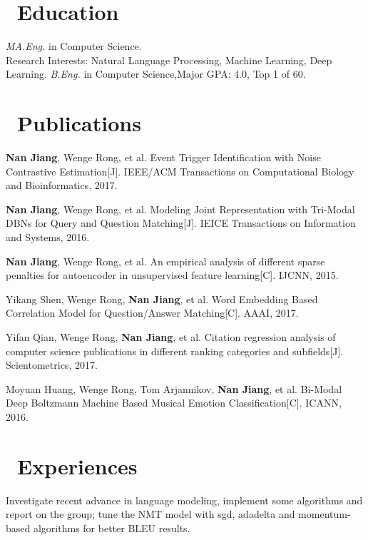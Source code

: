 \documentclass{resume}
\begin{document}



\section{\faGraduationCap\ Education }
\emph{MA.Eng.} in Computer Science. \\
Research Interests: Natural Language Processing, Machine Learning, Deep Learning.
\emph{B.Eng.} in Computer Science,\space Major GPA: 4.0, Top 1 of 60.




\section{\faBook\ Publications }

\textbf{Nan Jiang}, Wenge Rong, et al. Event Trigger Identification with Noise Contrastive Estimation[J]. IEEE/ACM Transactions on Computational Biology and Bioinformatics, 2017.

\textbf{Nan Jiang}, Wenge Rong, et al. Modeling Joint Representation with Tri-Modal DBNs for Query and Question Matching[J]. IEICE Transactions on Information and Systems, 2016.

\textbf{Nan Jiang}, Wenge Rong, et al. An empirical analysis of different sparse penalties for autoencoder in unsupervised feature learning[C]. IJCNN, 2015.

Yikang Shen, Wenge Rong, \textbf{Nan Jiang}, et al. Word Embedding Based Correlation Model for Question/Answer Matching[C]. AAAI, 2017.

Yifan Qian, Wenge Rong, \textbf{Nan Jiang}, et al. Citation regression analysis of computer science publications in different ranking categories and subfields[J]. Scientometrics, 2017.

Moyuan Huang, Wenge Rong, Tom Arjannikov, \textbf{Nan Jiang}, et al. Bi-Modal Deep Boltzmann Machine Based Musical Emotion Classification[C]. ICANN, 2016.




\section{\faUsers\ Experiences }
Investigate recent advance in language modeling, implement some algorithms and report on the group; tune the NMT model with sgd, adadelta and momentum-based algorithms for better BLEU results.
\end{document}

